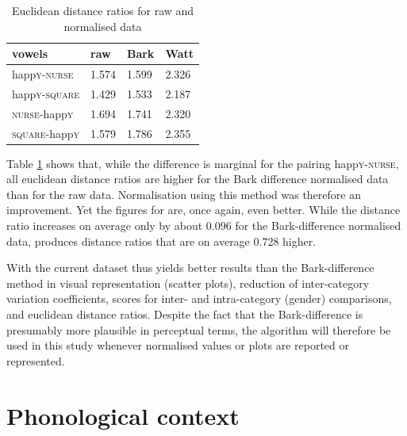 \begin{table}[h]
	\centering
	\caption{Euclidean distance ratios for raw and normalised data}
	\begin{tabular}{llll}
		\hline
		vowels & raw & Bark & Watt\\
		\hline
		happ\textsc{y}-\textsc{nurse} &
		1.574 &
		1.599 &
		2.326 \\
		happ\textsc{y}-\textsc{square} &
		1.429 &
		1.533 &
		2.187 \\
		\textsc{nurse}-happ\textsc{y} &
		1.694 &
		1.741 &
		2.320 \\
		\textsc{square}-happ\textsc{y} &
		1.579 &
		1.786 &
		2.355 \\
		\hline
	\end{tabular}
	\label{tab.euclid}
\end{table}

Table \ref{tab.euclid} shows that, while the difference is marginal for the pairing happ\textsc{y}-\textsc{nurse}, all euclidean distance ratios are higher for the Bark difference normalised data than for the raw data.
Normalisation using this method was therefore an improvement.
Yet the figures for \citeauthor{wattfabricius2002} are, once again, even better.
While the distance ratio increases on average only by about 0.096 for the Bark-difference normalised data, \citeauthor{wattfabricius2002} produces distance ratios that are on average 0.728 higher.

With the current dataset \citeauthor{wattfabricius2002} thus yields better results than the Bark-difference method in visual representation (scatter plots), reduction of inter-category variation coefficients,  scores for inter- and intra-category (gender) comparisons, and euclidean distance ratios.
Despite the fact that the Bark-difference  is presumably more plausible in perceptual terms, the \citeauthor{wattfabricius2002} algorithm will therefore be used in this study whenever normalised  values or plots are reported or represented.

\section{Phonological context}
\label{sec.prod_method.phon}

